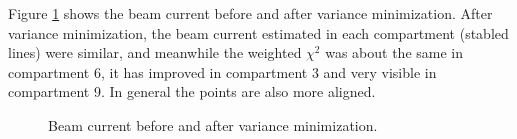 \documentclass[a4paper,11pt,twoside]{book}
\begin{document}
Figure \ref{fig:varmin_beamcurrent} shows the beam current before and after variance minimization. After variance minimization, the beam current estimated in each compartment (stabled lines) were similar, and meanwhile the weighted $\chi^2$ was about the same in compartment 6, it has improved in compartment 3 and very visible in compartment 9. In general the points are also more aligned. 

\begin{figure}%
    \centering
    \hfill
    \caption{Beam current before and after variance minimization.  }%
    \label{fig:varmin_beamcurrent}%
\end{figure}
\end{document}
